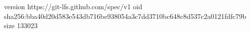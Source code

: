 version https://git-lfs.github.com/spec/v1
oid sha256:bba40d20d583e543db716be938054a3c7dd3710bc648c8d537c2a0121fdfc79b
size 133023
